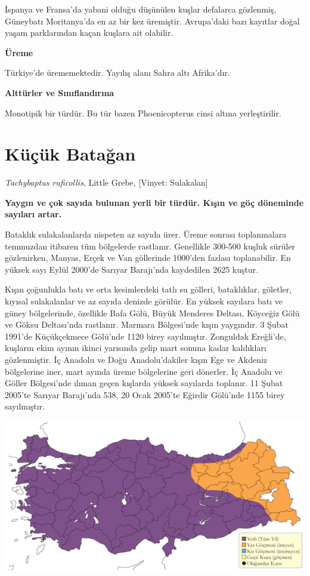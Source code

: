 \documentclass[
  a4paper,
  DIV=11,
  numbers=noendperiod]{scrreprt}
\begin{document}
İspanya ve Fransa'da yabani olduğu düşünülen kuşlar defalarca gözlenmiş,
Güneybatı Moritanya'da en az bir kez üremiştir. Avrupa'daki bazı
kayıtlar doğal yaşam parklarından kaçan kuşlara ait olabilir.

\textbf{Üreme}

Türkiye'de ürememektedir. Yayılış alanı Sahra altı Afrika'dır.

\textbf{Alttürler ve Sınıflandırma}

Monotipik bir türdür. Bu tür bazen Phoenicopterus cinsi altına
yerleştirilir.

\section{Küçük Batağan}\label{kuxfcuxe7uxfck-bataux11fan}

\emph{Tachybaptus ruficollis}, Little Grebe, {[}Vinyet: Sulakalan{]}

\textbf{Yaygın ve çok sayıda bulunan yerli bir türdür. Kışın ve göç
döneminde sayıları artar.}

Bataklık sulakalanlarda nispeten az sayıda ürer. Üreme sonrası
toplanmalara temmuzdan itibaren tüm bölgelerde rastlanır. Genellikle
300-500 kuşluk sürüler gözlenirken, Manyas, Erçek ve Van göllerinde
1000'den fazlası toplanabilir. En yüksek sayı Eylül 2000'de Sarıyar
Barajı'nda kaydedilen 2625 kuştur.

Kışın çoğunlukla batı ve orta kesimlerdeki tatlı su gölleri,
bataklıklar, göletler, kıyısal sulakalanlar ve az sayıda denizde
görülür. En yüksek sayılara batı ve güney bölgelerinde, özellikle Bafa
Gölü, Büyük Menderes Deltası, Köyceğiz Gölü ve Göksu Deltası'nda
rastlanır. Marmara Bölgesi'nde kışın yaygındır. 3 Şubat 1991'de
Küçükçekmece Gölü'nde 1120 birey sayılmıştır. Zonguldak Ereğli'de,
kuşların ekim ayının ikinci yarısında gelip mart sonuna kadar kaldıkları
gözlenmiştir. İç Anadolu ve Doğu Anadolu'dakiler kışın Ege ve Akdeniz
bölgelerine iner, mart ayında üreme bölgelerine geri dönerler. İç
Anadolu ve Göller Bölgesi'nde ılıman geçen kışlarda yüksek sayılarda
toplanır. 11 Şubat 2005'te Sarıyar Barajı'nda 538, 20 Ocak 2005'te
Eğirdir Gölü'nde 1155 birey sayılmıştır.

\includegraphics{images/harita_Page_051.png}
\end{document}
